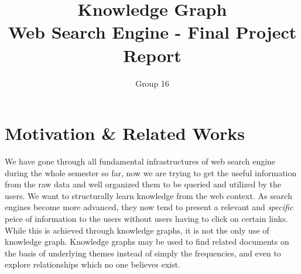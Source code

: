 \documentclass[11pt,twocolumn]{article}
\begin{document}
\baselineskip 16pt
 \newcommand{\la}{\lambda}
 \newcommand{\si}{\sigma}
 \newcommand{\ol}{1-\lambda}
 \newcommand{\be}{\begin{equation}}
 \newcommand{\ee}{\end{equation}}
 \newcommand{\bea}{\begin{eqnarray}}
 \newcommand{\eea}{\end{eqnarray}}

\setlength{\columnsep}{0.8cm}

 \newcommand{\secHead}[1]{{\bf \underline{#1}}\\}

 \newcommand{\mySection}[2]{

\begin{tabular}{l l}
\begin{minipage}[t]{1in}
\sc{#1 }
\end{minipage}

\begin{minipage}[t]{5in}
#2\\
\end{minipage}
\end{tabular}\\\\
}
\singlespacing


\title{Knowledge Graph \\ Web Search Engine - Final Project Report}
\author{Group 16}
\maketitle


\section{Motivation \& Related Works}
We have gone through all fundamental infrastructures of web search engine during the whole semester so far, now we are trying to get the useful information from the raw data and well organized them to be queried and utilized by the users. We want to structurally learn knowledge from the web context. As search engines become more advanced, they now tend to present a relevant and \emph{specific} peice of information to the users without users having to click on certain links. While this is achieved through knowledge graphs, it is not the only use of knowledge graph. Knowledge graphs may be used to find related documents on the basis of underlying themes instead of simply the frequencies, and even to explore relationships which no one believes exist.\\
\end{document}
